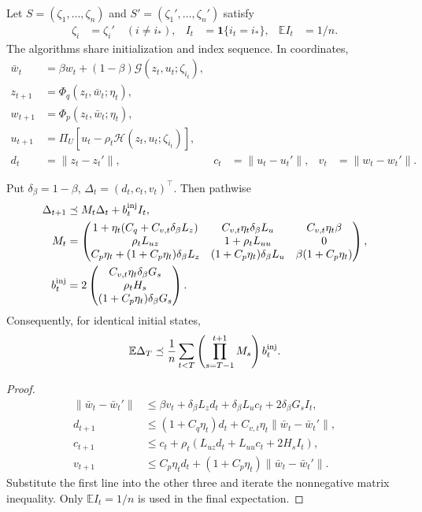 \begin{definition}
Let $S=(\zeta_1,\ldots,\zeta_n)$ and $S'=(\zeta_1',\ldots,\zeta_n')$ satisfy
\begin{align}
 \zeta_i&=\zeta_i'\quad(i\ne i_*),&
 I_t&=\mathbf1\{i_t=i_*\},&\mathbb EI_t&=1/n.
\end{align}
The algorithms share initialization and index sequence. In coordinates,
\begin{align}
 \bar w_t&=\beta w_t+(1-\beta)\mathcal G(z_t,u_t;\zeta_{i_t}),\\
 z_{t+1}&=\Phi_q(z_t,\bar w_t;\eta_t),\\
 w_{t+1}&=\Phi_p(z_t,\bar w_t;\eta_t),\\
 u_{t+1}&=\Pi_U[u_t-\rho_t\mathcal H(z_t,u_t;\zeta_{i_t})],\\
 d_t&=\|z_t-z_t'\|,&c_t&=\|u_t-u_t'\|,&v_t&=\|w_t-w_t'\|.
\end{align}
\end{definition}

\begin{theorem}
\label{thm:rigid-coupling-matrix}
Put $\delta_\beta=1-\beta$, $\Delta_t=(d_t,c_t,v_t)^\top$. Then pathwise
\begin{align}\label{eq:rigid-matrix-recursion}
 \Delta_{t+1}&\preceq M_t\Delta_t+b_t^{\rm inj}I_t,\\
 M_t&=\begin{pmatrix}
 1+\eta_t(C_q+C_{v,t}\delta_\beta L_z)&C_{v,t}\eta_t\delta_\beta L_u&C_{v,t}\eta_t\beta\\
 \rho_tL_{uz}&1+\rho_tL_{uu}&0\\
 C_p\eta_t+(1+C_p\eta_t)\delta_\beta L_z&
 (1+C_p\eta_t)\delta_\beta L_u&\beta(1+C_p\eta_t)
 \end{pmatrix},\\
 b_t^{\rm inj}
 &=2\begin{pmatrix}
 C_{v,t}\eta_t\delta_\beta G_s\\
 \rho_tH_s\\
 (1+C_p\eta_t)\delta_\beta G_s
 \end{pmatrix}.
\end{align}
Consequently, for identical initial states,
\begin{align}
 \mathbb E\Delta_T
 \preceq\frac1n\sum_{t<T}\left(\prod_{s=T-1}^{t+1}M_s\right)b_t^{\rm inj}.
\end{align}
\end{theorem}
\begin{proof}
\begin{align}
 \|\bar w_t-\bar w_t'\|
 &\le\beta v_t+\delta_\beta L_zd_t+\delta_\beta L_uc_t
 +2\delta_\beta G_sI_t,\\
 d_{t+1}&\le(1+C_q\eta_t)d_t+C_{v,t}\eta_t\|\bar w_t-\bar w_t'\|,\\
 c_{t+1}&\le c_t+\rho_t(L_{uz}d_t+L_{uu}c_t+2H_sI_t),\\
 v_{t+1}&\le C_p\eta_td_t+(1+C_p\eta_t)\|\bar w_t-\bar w_t'\|.
\end{align}
Substitute the first line into the other three and iterate the nonnegative matrix inequality. Only $\mathbb EI_t=1/n$ is used in the final expectation.
\end{proof}

